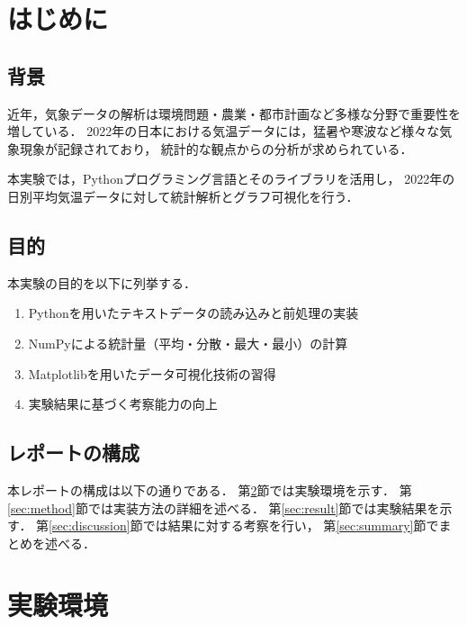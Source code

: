 \documentclass[12pt,a4paper]{ltjsarticle}
\begin{document}
\newpage
{}
\setcounter{page}{1}

\section{はじめに}\label{sec:intro}

\subsection{背景}

近年，気象データの解析は環境問題・農業・都市計画など多様な分野で重要性を増している．
2022年の日本における気温データには，猛暑や寒波など様々な気象現象が記録されており，
統計的な観点からの分析が求められている．

本実験では，Pythonプログラミング言語とそのライブラリを活用し，
2022年の日別平均気温データに対して統計解析とグラフ可視化を行う．

\subsection{目的}

本実験の目的を以下に列挙する．

\begin{enumerate}[label=(\arabic*)] %
  \item Pythonを用いたテキストデータの読み込みと前処理の実装
  \item NumPyによる統計量（平均・分散・最大・最小）の計算
  \item Matplotlibを用いたデータ可視化技術の習得
  \item 実験結果に基づく考察能力の向上
\end{enumerate}

\subsection{レポートの構成}

本レポートの構成は以下の通りである．
第\ref{sec:env}節では実験環境を示す．
第\ref{sec:method}節では実装方法の詳細を述べる．
第\ref{sec:result}節では実験結果を示す．
第\ref{sec:discussion}節では結果に対する考察を行い，
第\ref{sec:summary}節でまとめを述べる．

\section{実験環境}\label{sec:env}
\end{document}
